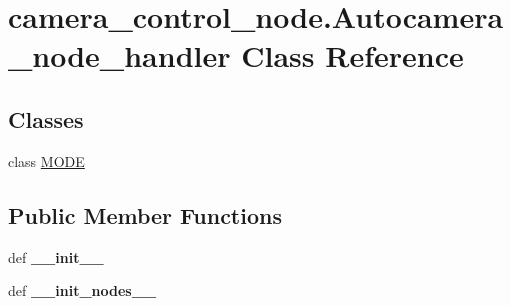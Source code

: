 \hypertarget{classcamera__control__node_1_1Autocamera__node__handler}{\section{camera\-\_\-control\-\_\-node.\-Autocamera\-\_\-node\-\_\-handler Class Reference}
\label{classcamera__control__node_1_1Autocamera__node__handler}
}
\subsection*{Classes}
\begin{DoxyCompactItemize}
\item 
class \hyperlink{classcamera__control__node_1_1Autocamera__node__handler_1_1MODE}{M\-O\-D\-E}
\end{DoxyCompactItemize}
\subsection*{Public Member Functions}
\begin{DoxyCompactItemize}
\item 
\hypertarget{classcamera__control__node_1_1Autocamera__node__handler_ab58e53ba67d6fb7113e11d7bb88c3b7f}{def {\bfseries \-\_\-\-\_\-init\-\_\-\-\_\-}}\label{classcamera__control__node_1_1Autocamera__node__handler_ab58e53ba67d6fb7113e11d7bb88c3b7f}

\item 
\hypertarget{classcamera__control__node_1_1Autocamera__node__handler_af00c572de6d9670c6d7d75f14fb7b8de}{def {\bfseries \-\_\-\-\_\-init\-\_\-nodes\-\_\-\-\_\-}}\label{classcamera__control__node_1_1Autocamera__node__handler_af00c572de6d9670c6d7d75f14fb7b8de}

\end{DoxyCompactItemize}
